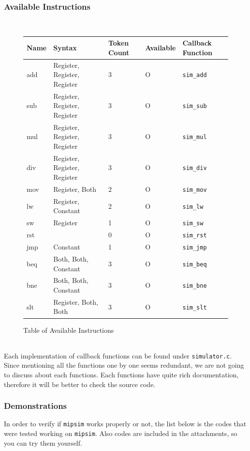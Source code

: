 \documentclass{homework}
\begin{document}
\subsubsection{Available Instructions}
\\
\begin{figure}[h]
\begin{center}
\begin{tabular}{|l|l|l|l|l|}
    \hline
        \textbf{Name} & \textbf{Syntax} & \textbf{Token Count} & \textbf{Available} & \textbf{Callback Function}\\
    \hline
        add & Register, Register, Register & 3 & O & \texttt{sim_add}\\
        sub & Register, Register, Register & 3 & O & \texttt{sim_sub}\\
        mul & Register, Register, Register & 3 & O & \texttt{sim_mul}\\
        div & Register, Register, Register & 3 & O & \texttt{sim_div}\\
        mov & Register, Both & 2 & O & \texttt{sim_mov}\\
        lw & Register, Constant & 2 & O & \texttt{sim_lw}\\
        sw & Register & 1 & O & \texttt{sim_sw}\\
        rst & & 0 & O & \texttt{sim_rst}\\
        jmp & Constant & 1 & O & \texttt{sim_jmp}\\
        beq & Both, Both, Constant & 3 & O & \texttt{sim_beq}\\
        bne & Both, Both, Constant & 3 & O & \texttt{sim_bne}\\
        slt & Register, Both, Both & 3 & O & \texttt{sim_slt}\\
    \hline
\end{tabular}
\caption{Table of Available Instructions}
\end{center}
\end{figure}
\\
Each implementation of callback functions can be found under \texttt{simulator.c}. Since mentioning all the functions one by one seems redundant, we are not going to discuss about each functions. Each functions have quite rich documentation, therefore it will be better to check the source code.  

\subsubsection{Demonstrations}
In order to verify if \texttt{mipsim} works properly or not, the list below is the codes that were tested working on \texttt{mipsim}. Also codes are included in the attachments, so you can try them yourself.
\end{document}
